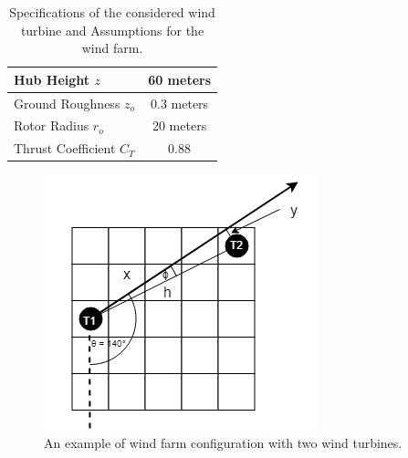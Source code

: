     \begin{table}[H]
        \centering
        \begin{tabular}{|l|c|} \hline
            Hub Height $z$ & 60 meters \\ \hline
            Ground Roughness $z_o$ & 0.3 meters \\ \hline
            Rotor Radius $r_o$ & 20 meters \\ \hline
            Thrust Coefficient $C_T $ & 0.88 \\ \hline
        \end{tabular}
        \caption{Specifications of the considered wind turbine and Assumptions for the wind farm.}
        \label{turbineSpecs}
    \end{table}
    
    \begin{figure}[H]
        \centering
        \includegraphics[width=0.5\linewidth]{Figures/sampleSmall1.png}
        \caption{An example of wind farm configuration with two wind turbines.}
        \label{sampleSmall1}
    \end{figure}
    
